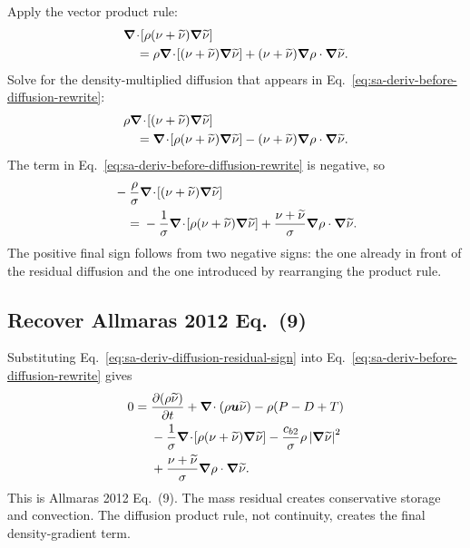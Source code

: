 Apply the vector product rule:
\begin{align}
  &\boldsymbol{\nabla}\!\cdot\!\left[
    \rho(\nu+\widetilde{\nu})\boldsymbol{\nabla}\widetilde{\nu}
  \right] \notag\\
  &\quad={}
  \rho\boldsymbol{\nabla}\!\cdot\!\left[
    (\nu+\widetilde{\nu})\boldsymbol{\nabla}\widetilde{\nu}
  \right]
  +(\nu+\widetilde{\nu})
   \boldsymbol{\nabla}\rho\mathbin{\cdot}\boldsymbol{\nabla}\widetilde{\nu}.
  \label{eq:sa-deriv-diffusion-product}
\end{align}
Solve for the density-multiplied diffusion that appears in
Eq.~\eqref{eq:sa-deriv-before-diffusion-rewrite}:
\begin{align}
  &\rho\boldsymbol{\nabla}\!\cdot\!\left[
    (\nu+\widetilde{\nu})\boldsymbol{\nabla}\widetilde{\nu}
  \right] \notag\\
  &\quad={}
  \boldsymbol{\nabla}\!\cdot\!\left[
    \rho(\nu+\widetilde{\nu})\boldsymbol{\nabla}\widetilde{\nu}
  \right]
  -(\nu+\widetilde{\nu})
   \boldsymbol{\nabla}\rho\mathbin{\cdot}\boldsymbol{\nabla}\widetilde{\nu}.
  \label{eq:sa-deriv-diffusion-rearranged}
\end{align}
The term in Eq.~\eqref{eq:sa-deriv-before-diffusion-rewrite} is negative, so
\begin{align}
  &-\frac{\rho}{\sigma}\boldsymbol{\nabla}\!\cdot\!\left[
    (\nu+\widetilde{\nu})\boldsymbol{\nabla}\widetilde{\nu}
  \right] \notag\\
  &\quad={}
  -\frac{1}{\sigma}\boldsymbol{\nabla}\!\cdot\!\left[
    \rho(\nu+\widetilde{\nu})\boldsymbol{\nabla}\widetilde{\nu}
  \right]
  +\frac{\nu+\widetilde{\nu}}{\sigma}
   \boldsymbol{\nabla}\rho\mathbin{\cdot}\boldsymbol{\nabla}\widetilde{\nu}.
  \label{eq:sa-deriv-diffusion-residual-sign}
\end{align}
The positive final sign follows from two negative signs: the one already in
front of the residual diffusion and the one introduced by rearranging the
product rule.

\subsection{Recover Allmaras 2012 Eq.~(9)}

Substituting Eq.~\eqref{eq:sa-deriv-diffusion-residual-sign} into
Eq.~\eqref{eq:sa-deriv-before-diffusion-rewrite} gives
\begin{align}
  0={}&
  \frac{\partial(\rho\widetilde{\nu})}{\partial t}
  +\boldsymbol{\nabla}\!\cdot(\rho\boldsymbol u\widetilde{\nu})
  -\rho(P-D+T) \notag\\
  &-\frac{1}{\sigma}\boldsymbol{\nabla}\!\cdot\!\left[
    \rho(\nu+\widetilde{\nu})\boldsymbol{\nabla}\widetilde{\nu}
  \right]
  -\frac{c_{b2}}{\sigma}\rho
   \left|\boldsymbol{\nabla}\widetilde{\nu}\right|^2 \notag\\
  &+\frac{\nu+\widetilde{\nu}}{\sigma}
   \boldsymbol{\nabla}\rho\mathbin{\cdot}\boldsymbol{\nabla}\widetilde{\nu}.
  \label{eq:sa-deriv-paper-final}
\end{align}
This is Allmaras 2012 Eq.~(9).  The mass residual creates conservative storage and
convection.  The diffusion product rule, not continuity, creates the final
density-gradient term.

\clearpage
\endgroup

